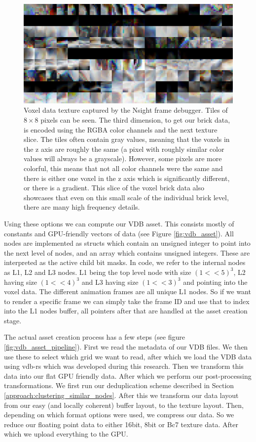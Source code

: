 \begin{figure}[H]
    \centering
    \includegraphics[width=\linewidth]{figures/voxel_memory_view.png}
    \caption{Voxel data texture captured by the Nsight frame debugger. Tiles of $8\times 8$ pixels can be seen. The third dimension, to get our brick data, is encoded using the RGBA color channels and the next texture slice. The tiles often contain gray values, meaning that the voxels in the z axis are roughly the same (a pixel with roughly similar color values will always be a grayscale). However, some pixels are more colorful, this means that not all color channels were the same and there is either one voxel in the z axis which is significantly different, or there is a gradient. This slice of the voxel brick data also showcases that even on this small scale of the individual brick level, there are many high frequency details.}
    \label{fig:vdb_asset:memory_view}
\end{figure}


Using these options we can compute our VDB asset. This consists mostly of constants and GPU-friendly vectors of data (see Figure \ref{fig:vdb_asset}). All nodes are implemented as structs which contain an unsigned integer to point into the next level of nodes, and an array which contains unsigned integers. These are interpreted as the active child bit masks. In code, we refer to the internal nodes as L1, L2 and L3 nodes. L1 being the top level node with size $(1 << 5)^3$, L2 having size $(1 << 4)^3$ and L3 having size $(1 << 3)^3$ and pointing into the voxel data. The different animation frames are all unique L1 nodes. So if we want to render a specific frame we can simply take the frame ID and use that to index into the L1 nodes buffer, all pointers after that are handled at the asset creation stage.

The actual asset creation process has a few steps (see figure \ref{fig:vdb_asset_pipeline}). First we read the metadata of our VDB files. We then use these to select which grid we want to read, after which we load the VDB data using vdb-rs \cite{VDBRS} which was developed during this research. Then we transform this data into our flat GPU friendly data. After which we perform our post-processing transformations. We first run our deduplication scheme described in Section \ref{approach:clustering_similar_nodes}. After this we transform our data layout from our easy (and locally coherent) buffer layout, to the texture layout. Then, depending on which format options were used, we compress our data. So we reduce our floating point data to either 16bit, 8bit or Bc7 texture data. After which we upload everything to the GPU.

